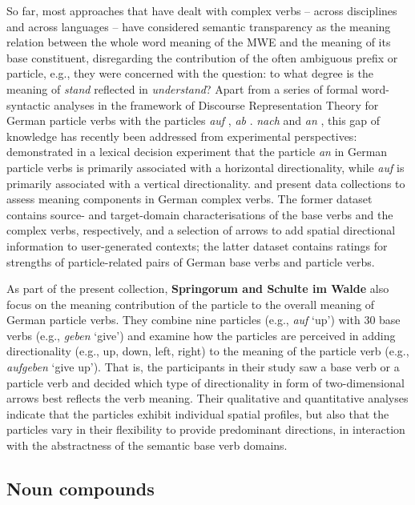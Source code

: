\documentclass[output=paper]{langsci/langscibook}
\begin{document}
So far, most approaches that have dealt with complex verbs -- across
disciplines and across languages -- have considered semantic
transparency as the meaning relation between the whole word meaning of
the MWE and the meaning of its base constituent, disregarding the
contribution of the often ambiguous prefix or particle, e.g., they
were concerned with the question: to what degree is the meaning of
\textit{stand} reflected in \textit{understand}? Apart from a series
of formal word-syntactic analyses in the framework of
Discourse Representation Theory \citep{Kamp/Reyle:93} for
German particle verbs with the particles \textit{auf}
\citep{Lechler/Rossdeutscher:09}, \textit{ab} \citep{Kliche:11}. \textit{nach}
\citep{Haselbach:11} and 
\textit{an} \citep{Springorum:11}, this gap of knowledge has recently been
addressed from experimental perspectives: \cite{FrassinelliEtAl:17}
demonstrated in a lexical decision experiment that the particle
\textit{an} in German particle verbs is primarily associated with a
horizontal directionality, while \textit{auf} is primarily associated
with a vertical directionality. \citet{SchulteImWaldeEtAl:18} and
\citet{Koeper/SchulteImWalde:18} present data collections to assess
meaning components in German complex verbs. The former dataset
contains source- and target-domain characterisations of the base verbs
and the complex verbs, respectively, and a selection of arrows to add
spatial directional information to user-generated contexts; the latter
dataset contains ratings for strengths of particle-related pairs of
German base verbs and particle verbs.

As part of the present collection, \textbf{Springorum and Schulte im
  Walde} also focus on the meaning contribution of the particle to the
overall meaning of German particle verbs. They combine nine particles
(e.g., \textit{auf} `up') with 30 base verbs (e.g., \textit{geben}
`give') and examine how the particles are perceived in adding
directionality (e.g., up, down, left, right) to the meaning of the
particle verb (e.g., \textit{aufgeben} `give up'). That is, the
participants in their study saw a base verb or a particle verb and
decided which type of directionality in form of two-dimensional arrows
best reflects the verb meaning. Their qualitative and quantitative
analyses indicate that the particles exhibit individual spatial
profiles, but also that the particles vary in their flexibility to
provide predominant directions, in interaction with the abstractness
of the semantic base verb domains.


\subsection{Noun compounds}
\label{sec:compounds}
\end{document}
